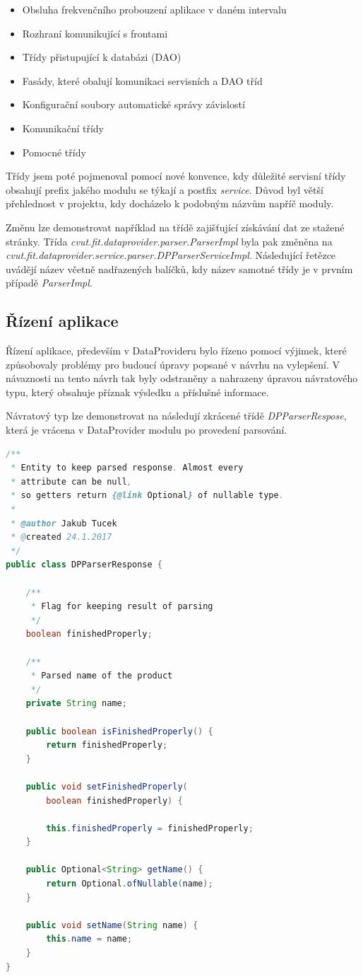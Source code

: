 \documentclass[thesis=B,czech]{FITthesis}[2012/06/26]
\begin{document}
\begin{itemize}
\item Obsluha frekvenčního probouzení aplikace v daném intervalu
\item Rozhraní komunikující s frontami
\item Třídy přistupující k databázi (DAO)
\item Fasády, které obalují komunikaci servisních a DAO tříd
\item Konfigurační soubory automatické správy závislostí
\item Komunikační třídy
\item Pomocné třídy
\end{itemize}

Třídy jsem poté pojmenoval pomocí nové konvence, kdy důležité servisní třídy obsahují prefix jakého modulu se týkají
a postfix \textit{service}. Důvod byl větší přehlednost v projektu, kdy docházelo k podobným názvům napříč moduly.
\par
Změnu lze demonstrovat například na třídě zajišťující získávání dat ze stažené stránky. Třída \textit{cvut.fit.dataprovider.parser.ParserImpl} byla pak změněna na \textit{cvut.fit.dataprovider.service.parser.DPParserServiceImpl}. Následující řetězce uvádějí název včetně 
nadřazených balíčků, kdy název samotné třídy je v prvním případě \textit{ParserImpl}.

\subsection{Řízení aplikace}
Řízení aplikace, především v DataProvideru bylo řízeno pomocí výjimek, které způsobovaly problémy pro budoucí úpravy 
popsané v návrhu na vylepšení.
V návaznosti na tento návrh tak byly odstraněny a nahrazeny úpravou návratového typu, který obsahuje příznak výsledku 
a příslušné informace.
\par
Návratový typ lze demonstrovat na následují zkrácené třídě \textit{DPParserRespose}, která je vrácena v DataProvider modulu
po provedení parsování.

\begin{lstlisting}[language=Java]
/**
 * Entity to keep parsed response. Almost every 
 * attribute can be null, 
 * so getters return {@link Optional} of nullable type.
 *
 * @author Jakub Tucek
 * @created 24.1.2017
 */
public class DPParserResponse {

    /**
     * Flag for keeping result of parsing
     */
    boolean finishedProperly;

    /**
     * Parsed name of the product
     */
    private String name;

    public boolean isFinishedProperly() {
        return finishedProperly;
    }

    public void setFinishedProperly(
    	boolean finishedProperly) {
    	
        this.finishedProperly = finishedProperly;
    }

    public Optional<String> getName() {
        return Optional.ofNullable(name);
    }

    public void setName(String name) {
        this.name = name;
    }
}
\end{lstlisting}
\end{document}
